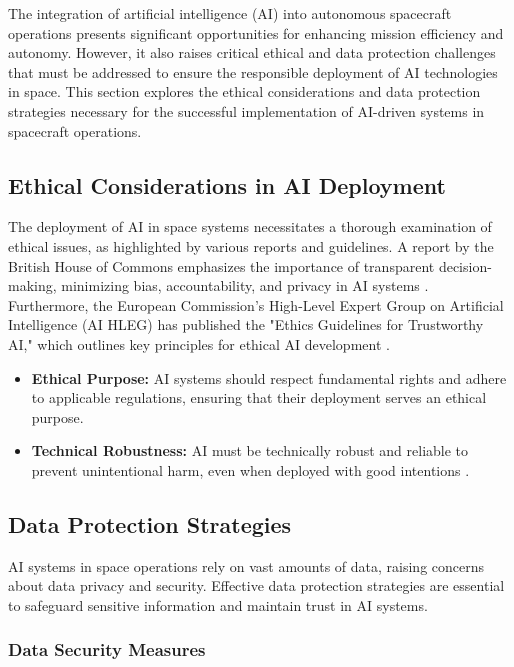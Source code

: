 \documentclass[a4paper,12pt]{article}
\begin{document}
The integration of artificial intelligence (AI) into autonomous spacecraft operations presents significant opportunities for enhancing mission efficiency and autonomy. However, it also raises critical ethical and data protection challenges that must be addressed to ensure the responsible deployment of AI technologies in space. This section explores the ethical considerations and data protection strategies necessary for the successful implementation of AI-driven systems in spacecraft operations.

\subsection{Ethical Considerations in AI Deployment}

The deployment of AI in space systems necessitates a thorough examination of ethical issues, as highlighted by various reports and guidelines. A report by the British House of Commons emphasizes the importance of transparent decision-making, minimizing bias, accountability, and privacy in AI systems \cite{british_report_325}. Furthermore, the European Commission's High-Level Expert Group on Artificial Intelligence (AI HLEG) has published the "Ethics Guidelines for Trustworthy AI," which outlines key principles for ethical AI development \cite{european_commission_344}.

\begin{itemize}
    \item \textbf{Ethical Purpose:} AI systems should respect fundamental rights and adhere to applicable regulations, ensuring that their deployment serves an ethical purpose.
    \item \textbf{Technical Robustness:} AI must be technically robust and reliable to prevent unintentional harm, even when deployed with good intentions \cite{european_commission_344}.
\end{itemize}

\subsection{Data Protection Strategies}

AI systems in space operations rely on vast amounts of data, raising concerns about data privacy and security. Effective data protection strategies are essential to safeguard sensitive information and maintain trust in AI systems.

\subsubsection{Data Security Measures}
\end{document}
